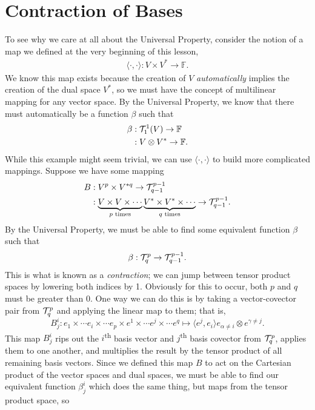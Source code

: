 \section{Contraction of Bases}
To see why we care at all about the Universal Property, consider the notion of a map we defined at the very beginning of this lesson,
\begin{align*}
    \langle \cdot, \cdot \rangle : V \times V^* \to \mathbb{F}.
\end{align*}
We know this map exists because the creation of $V$ \emph{automatically} implies the creation of the dual space $V^*$, so we must have the concept of multilinear mapping for any vector space.
By the Universal Property, we know that there must automatically be a function $\beta$ such that
\begin{align*}
    \beta &: \mathcal{T}^1_1 (V) \to \mathbb{F} \\
      &: V \otimes V^* \to \mathbb{F}.
\end{align*}
While this example might seem trivial, we can use $\langle \cdot, \cdot \rangle$ to build more complicated mappings.
Suppose we have some mapping
\begin{align*}
    B &: V^p \times V^{*q} \to \mathcal{T}^{p-1}_{q-1} \\
      &: \underbrace{V \times V \times \cdots}_{\text{$p$ times}}\underbrace{V^* \times V^* \times \cdots}_{\text{$q$ times}} \to \mathcal{T}^{p-1}_{q-1}.
\end{align*}
By the Universal Property, we must be able to find some equivalent function $\beta$ such that
\[ \beta : \mathcal{T}^p_q \to \mathcal{T}^{p-1}_{q-1}. \]
This is what is known as a \emph{contraction}; we can jump between tensor product spaces by lowering both indices by 1.
Obviously for this to occur, both $p$ and $q$ must be greater than 0.
One way we can do this is by taking a vector-covector pair from $\mathcal{T}^p_q$ and applying the linear map to them; that is,
\[ B^i_j : e_1 \times \cdots e_i \times \cdots e_p \times e^1 \times \cdots e^j \times \cdots e^q \mapsto \langle e^j, e_i \rangle e_{\alpha \not= i} \otimes e^{\gamma \not= j}. \]
This map $B^i_j$ rips out the $i$\textsuperscript{th} basis vector and $j$\textsuperscript{th} basis covector from $\mathcal{T}^p_q$, applies them to one another, and multiplies the result by the tensor product of all remaining basis vectors.
Since we defined this map $B$ to act on the Cartesian product of the vector spaces and dual spaces, we must be able to find our equivalent function $\beta^i_j$ which does the same thing, but maps from the tensor product space, so
